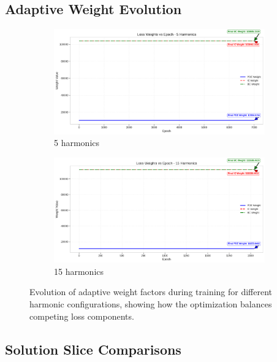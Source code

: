 \subsection{Adaptive Weight Evolution}

\begin{figure}[H]
    \centering
    \begin{subfigure}[b]{0.48\textwidth}
        \centering
        \includegraphics[width=\textwidth]{figures/weight_factors_5h.png}
        \caption{5 harmonics}
    \end{subfigure}
    \hfill
    \begin{subfigure}[b]{0.48\textwidth}
        \centering
        \includegraphics[width=\textwidth]{figures/weight_factors_15h.png}
        \caption{15 harmonics}
    \end{subfigure}
    \caption{Evolution of adaptive weight factors during training for different harmonic configurations, showing how the optimization balances competing loss components.}
    \label{fig:weight_comparison}
\end{figure}

\subsection{Solution Slice Comparisons}

